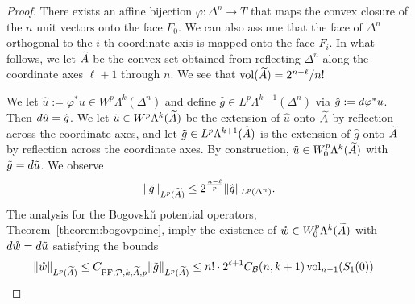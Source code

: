 \documentclass[10pt,a4paper]{article}
\begin{document}
\begin{proof}
    There exists an affine bijection $\varphi : \Delta^n \rightarrow T$ 
    that maps the convex closure of the $n$ unit vectors onto the face $F_0$.
    We can also assume that the face of $\Delta^n$
    orthogonal to the $i$-th coordinate axis is mapped 
    onto the face $F_i$. 
    In what follows, we let $\widetilde {A}$ be the convex set obtained from reflecting $\Delta^n$ along the coordinate axes $\ell+1$ through $n$. 
    We see that $\operatorname{vol}(\widetilde {A}) = 2^{n-\ell}/n!$
    
    We let $\hat u := \varphi^{\ast} u \in W^{p}\Lambda^{k}(\Delta^n)$ and define $\hat g \in L^{p}\Lambda^{k+1}(\Delta^n)$ via $\hat g := d \varphi^{\ast} u$. 
    Then $d \hat u = \hat g$. 
    We let $\tilde u \in W^{p}\Lambda^{k}(\widetilde {A})$ be the extension of $\hat u$ onto $\widetilde {A}$ by reflection across the coordinate axes,
    and let $\tilde g \in L^{p}\Lambda^{k+1}(\widetilde {A})$ is the extension of $\hat g$ onto $\widetilde {A}$ by reflection across the coordinate axes. 
    By construction, $\tilde u \in W^{p}_{0}\Lambda^{k}(\widetilde {A})$ with $\tilde g = d \tilde u$.
    We observe 
    \begin{align*}
        \| \tilde g \|_{L^{p}(\widetilde {A})}
        \leq 
        2^{\frac {n-\ell} p}
        \| \hat g \|_{L^{p}(\Delta^n)}
        .
    \end{align*}
    The analysis for the Bogovski\u{\i} potential operators, Theorem~\ref{theorem:bogovpoinc}, imply 
    the existence of $\mathring w \in W^{p}_{0}\Lambda^{k}(\widetilde {A})$
    with $d \mathring w = d \tilde u$ satisfying the bounds 
    \begin{align*}
        \| \mathring w \|_{L^{p}(\widetilde \Makoto)}
        &\leq 
        C_{{\PF},\Poinc,k,\widetilde \Makoto,p}
        \| \tilde g \|_{L^{p}(\widetilde \Makoto)}
        \leq 
        n! \cdot 2^{\ell+1} C_{\Bogov}(n,k+1) \vol_{n-1}(S_1(0)) 

\end{align*}
\end{proof}
\end{document}
